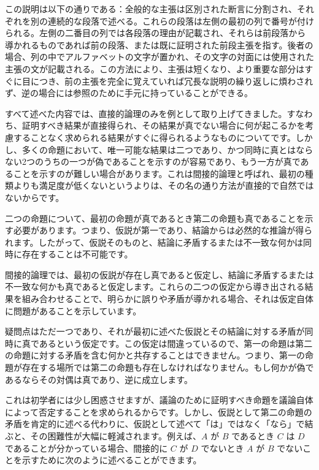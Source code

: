 \documentclass[a4paper,11pt,openany]{ltjsbook}
\begin{document}
この説明は以下の通りである：全般的な主張は区別された断言に分割され、それぞれを別の連続的な段落で述べる。これらの段落は左側の最初の列で番号が付けられる。左側の二番目の列では各段落の理由が記載され、それらは前段落から導かれるものであれば前の段落、または既に証明された前段主張を指す。後者の場合、列の中でアルファベットの文字が置かれ、その文字の対面には使用された主張の文が記載される。この方法により、主張は短くなり、より重要な部分はすぐに目につき、前の主張を完全に覚えていれば冗長な説明の繰り返しに煩わされず、逆の場合には参照のために手元に持っていることができる。

すべて述べた内容では、直接的論理のみを例として取り上げてきました。すなわち、証明すべき結果が直接得られ、その結果が真でない場合に何が起こるかを考慮することなく求められる結果がすぐに得られるようなものについてです。しかし、多くの命題において、唯一可能な結果は二つであり、かつ同時に真とはならない2つのうちの一つが偽であることを示すのが容易であり、もう一方が真であることを示すのが難しい場合があります。これは間接的論理と呼ばれ、最初の種類よりも満足度が低くないというよりは、その名の通り方法が直接的で自然ではないからです。

二つの命題について、最初の命題が真であるとき第二の命題も真であることを示す必要があります。つまり、仮説が第一であり、結論からは必然的な推論が得られます。したがって、仮説そのものと、結論に矛盾するまたは不一致な何かは同時に存在することは不可能です。

間接的論理では、最初の仮説が存在し真であると仮定し、結論に矛盾するまたは不一致な何かも真であると仮定します。これらの二つの仮定から導き出される結果を組み合わせることで、明らかに誤りや矛盾が導かれる場合、それは仮定自体に問題があることを示しています。

疑問点はただ一つであり、それが最初に述べた仮説とその結論に対する矛盾が同時に真であるという仮定です。この仮定は間違っているので、第一の命題は第二の命題に対する矛盾を含む何かと共存することはできません。つまり、第一の命題が存在する場所では第二の命題も存在しなければなりません。もし何かが偽であるならその対偶は真であり、逆に成立します。

これは初学者には少し困惑させますが、議論のために証明すべき命題を議論自体によって否定することを求められるからです。しかし、仮説として第二の命題の矛盾を肯定的に述べる代わりに、仮説として述べて「は」ではなく「なら」で結ぶと、その困難性が大幅に軽減されます。例えば、$A$ が $B$ であるとき $C$ は $D$ であることが分かっている場合、間接的に $C$ が $D$ でないとき $A$ が $B$ でないことを示すために次のように述べることができます。
\end{document}
